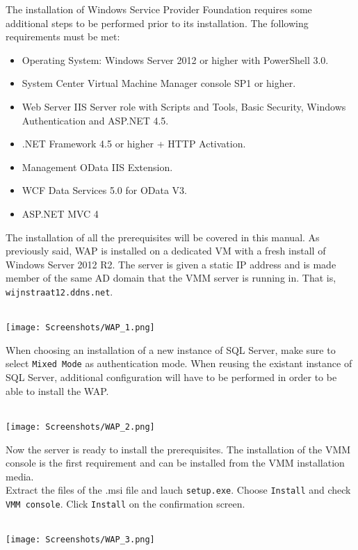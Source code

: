 The installation of Windows Service Provider Foundation requires some additional steps to be performed prior to its installation. The following requirements must be met:
\begin{itemize}
\item Operating System: Windows Server 2012 or higher with PowerShell 3.0.
\item System Center Virtual Machine Manager console SP1 or higher.
\item Web Server IIS Server role with Scripts and Tools, Basic Security, Windows Authentication and ASP.NET 4.5.
\item .NET Framework 4.5 or higher + HTTP Activation.
\item Management OData IIS Extension.
\item WCF Data Services 5.0 for OData V3.
\item ASP.NET MVC 4
\end{itemize}
The installation of all the prerequisites will be covered in this manual. As previously said, WAP is installed on a dedicated VM with a fresh install of Windows Server 2012 R2. The server is given a static IP address and is made member of the same AD domain that the VMM server is running in. That is, \texttt{wijnstraat12.ddns.net}.
$\;$ \\ \\
\noindent\begin{minipage}{\textwidth}
    \centering
    \texttt{[image: Screenshots/WAP\_1.png]}
\end{minipage}
When choosing an installation of a new instance of SQL Server, make sure to select \texttt{Mixed Mode} as authentication mode. When reusing the existant instance of SQL Server, additional configuration will have to be performed in order to be able to install the WAP.
$\;$ \\ \\
\noindent\begin{minipage}{\textwidth}
    \centering
    \texttt{[image: Screenshots/WAP\_2.png]}
\end{minipage}

\clearpage

Now the server is ready to install the prerequisites. The installation of the VMM console is the first requirement and can be installed from the VMM installation media. \\
Extract the files of the .msi file and lauch \texttt{setup.exe}. Choose \texttt{Install} and check \texttt{VMM console}. Click \texttt{Install} on the confirmation screen.
$\;$ \\ \\
\noindent\begin{minipage}{\textwidth}
    \centering
    \texttt{[image: Screenshots/WAP\_3.png]}
\end{minipage}

